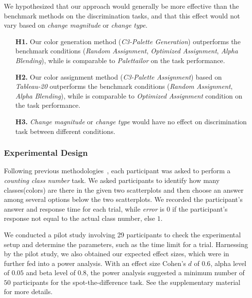 \vspace{.3em}
 We hypothesized that our approach would generally be more effective than the benchmark methods on the discrimination tasks, and that this effect would not vary based on \emph{change magnitude} or \emph{change type}.
\begin{itemize}[noitemsep]
\setlength{\itemsep}{5pt}
    \item[\textbf{H1.}] Our color generation method (\emph{C3-Palette Generation}) outperforms the benchmark conditions (\emph{Random Assignment}, \emph{Optimized Assignment}, \emph{Alpha Blending}), while is comparable to  \emph{Palettailor} on the task performance.

    \item [\textbf{H2.}] Our color assignment method (\emph{C3-Palette Assignment}) based on \emph{Tableau-20} outperforms the benchmark conditions (\emph{Random Assignment}, \emph{Alpha Blending}), while is comparable to \emph{Optimized Assignment} condition on the task performance.

    \item [\textbf{H3.}] \emph{Change magnitude} or \emph{change type} would have no effect on discrimination task between different conditions.

\end{itemize}

\subsubsection{Experimental Design}
\vspace{.3em}
Following previous methodologies~\cite{Wang2018, Lu21}, each participant was asked to perform a \emph{counting class number} task.  We asked participants to identify how many classes(colors) are there in the given two scatterplots and then choose an answer among several options below the two scatterplots. We recorded the participant's answer and response time for each trial, while \emph{error} is $0$ if the participant's response not equal to the actual class number, else $1$.


\vspace{.3em}
We conducted a pilot study involving 29 participants to check the experimental setup and determine the parameters, such as the time limit for a trial.
Harnessing by the pilot study, we also obtained our expected effect sizes, which were in further fed into a power analysis. With an effect size Cohen's $d$ of $0.6$, alpha level of $0.05$ and beta level of $0.8$, the power analysis suggested a minimum number of $50$ participants for the spot-the-difference task. See the supplementary material for more details.

